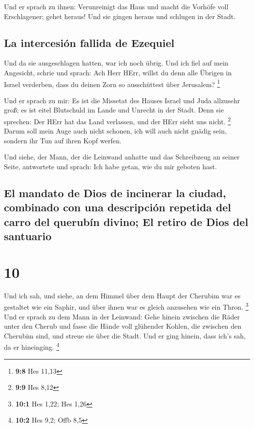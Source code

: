  Und er sprach zu ihnen: Verunreinigt das Haus und macht
die Vorhöfe voll Erschlagener; gehet heraus! Und sie gingen heraus und
schlugen in der Stadt.

\hypertarget{la-intercesiuxf3n-fallida-de-ezequiel}{%
\subsection{La intercesión fallida de
Ezequiel}\label{la-intercesiuxf3n-fallida-de-ezequiel}}

 Und da sie ausgeschlagen hatten, war ich noch übrig. Und
ich fiel auf mein Angesicht, schrie und sprach: Ach Herr HErr, willst du
denn alle Übrigen in Israel verderben, dass du deinen Zorn so
ausschüttest über Jerusalem? \footnote{\textbf{9:8} Hes 11,13}

 Und er sprach zu mir: Es ist die Missetat des Hauses
Israel und Juda allzusehr groß; es ist eitel Blutschuld im Lande und
Unrecht in der Stadt. Denn sie sprechen: Der HErr hat das Land
verlassen, und der HErr sieht uns nicht. \footnote{\textbf{9:9} Hes 8,12}
 Darum soll mein Auge auch nicht schonen, ich will auch
nicht gnädig sein, sondern ihr Tun auf ihren Kopf werfen.

 Und siehe, der Mann, der die Leinwand anhatte und das
Schreibzeug an seiner Seite, antwortete und sprach: Ich habe getan, wie
du mir geboten hast.

\hypertarget{el-mandato-de-dios-de-incinerar-la-ciudad-combinado-con-una-descripciuxf3n-repetida-del-carro-del-querubuxedn-divino-el-retiro-de-dios-del-santuario}{%
\subsection{El mandato de Dios de incinerar la ciudad, combinado con una
descripción repetida del carro del querubín divino; El retiro de Dios
del
santuario}\label{el-mandato-de-dios-de-incinerar-la-ciudad-combinado-con-una-descripciuxf3n-repetida-del-carro-del-querubuxedn-divino-el-retiro-de-dios-del-santuario}}

\hypertarget{section-9}{%
\section{10}\label{section-9}}

 Und ich sah, und siehe, an dem Himmel über dem Haupt der
Cherubim war es gestaltet wie ein Saphir, und über ihnen war es gleich
anzusehen wie ein Thron. \footnote{\textbf{10:1} Hes 1,22; Hes 1,26}
 Und er sprach zu dem Mann in der Leinwand: Gehe hinein
zwischen die Räder unter den Cherub und fasse die Hände voll glühender
Kohlen, die zwischen den Cherubim sind, und streue sie über die Stadt.
Und er ging hinein, dass ich's sah, da er hineinging. \footnote{\textbf{10:2}
  Hes 9,2; Offb 8,5}

